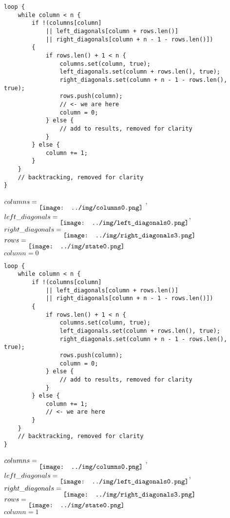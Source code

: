 \begin{frame}[fragile]
    \begin{verbatim}
loop {
    while column < n {
        if !(columns[column]
            || left_diagonals[column + rows.len()]
            || right_diagonals[column + n - 1 - rows.len()])
        {
            if rows.len() + 1 < n {
                columns.set(column, true);
                left_diagonals.set(column + rows.len(), true);
                right_diagonals.set(column + n - 1 - rows.len(), true);
                rows.push(column);
                // <- we are here
                column = 0;
            } else {
                // add to results, removed for clarity
            }
        } else {
            column += 1;
        }
    }
    // backtracking, removed for clarity
}
    \end{verbatim}
    $columns = \raisebox{-2ex}{\texttt{[image: ../img/columns0.png]}}$ ,
    $left\_diagonals = \raisebox{-2ex}{\texttt{[image: ../img/left\_diagonals0.png]}}$,
    $right\_diagonals = \raisebox{-2ex}{\texttt{[image: ../img/right\_diagonals3.png]}}$ \\
    $rows = \raisebox{-2ex}{\texttt{[image: ../img/state0.png]}}$ \\
    $column = 0$
\end{frame}
\begin{frame}[fragile]
    \begin{verbatim}
loop {
    while column < n {
        if !(columns[column]
            || left_diagonals[column + rows.len()]
            || right_diagonals[column + n - 1 - rows.len()])
        {
            if rows.len() + 1 < n {
                columns.set(column, true);
                left_diagonals.set(column + rows.len(), true);
                right_diagonals.set(column + n - 1 - rows.len(), true);
                rows.push(column);
                column = 0;
            } else {
                // add to results, removed for clarity
            }
        } else {
            column += 1;
            // <- we are here
        }
    }
    // backtracking, removed for clarity
}
    \end{verbatim}
    $columns = \raisebox{-2ex}{\texttt{[image: ../img/columns0.png]}}$ ,
    $left\_diagonals = \raisebox{-2ex}{\texttt{[image: ../img/left\_diagonals0.png]}}$,
    $right\_diagonals = \raisebox{-2ex}{\texttt{[image: ../img/right\_diagonals3.png]}}$ \\
    $rows = \raisebox{-2ex}{\texttt{[image: ../img/state0.png]}}$ \\
    $column = 1$
\end{frame}
